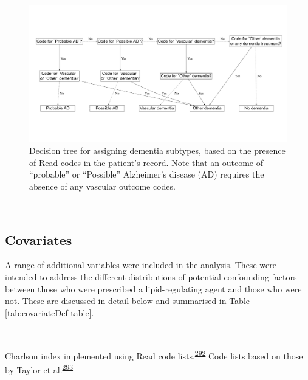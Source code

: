 \documentclass[a4paper, twoside]{templates/ociamthesis}
\begin{document}
\begin{figure}[H]
\includegraphics[width=1\linewidth]{figures/cprd-analysis/decision_tree} \caption[Decision tree for assigning dementia subtypes]{Decision tree for assigning dementia subtypes, based on the presence of Read codes in the patient's record. Note that an outcome of ``probable'' or ``Possible'' Alzheimer's disease (AD) requires the absence of any vascular outcome codes.}\label{fig:decisionTreeFig}
\end{figure}

~

\hypertarget{covariates}{%
\subsection{Covariates}\label{covariates}}

A range of additional variables were included in the analysis. These were intended to address the different distributions of potential confounding factors between those who were prescribed a lipid-regulating agent and those who were not. These are discussed in detail below and summarised in Table \ref{tab:covariateDef-table}.

~









Charlson index implemented using Read code lists.\textsuperscript{\protect\hyperlink{ref-khan2010}{292}} Code lists based on those by Taylor et al.\textsuperscript{\protect\hyperlink{ref-taylor2016}{293}}
\end{document}
